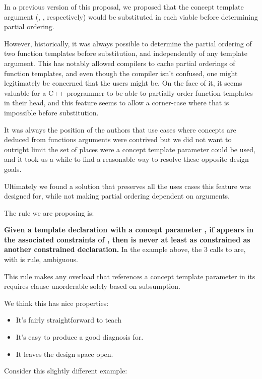 \documentclass{wg21}
\begin{document}
In a previous version of this proposal, we proposed that the concept template argument (, ,  respectively)
would be substituted in each viable  before determining partial ordering.

However, historically, it was always possible to determine the partial ordering of two function templates before substitution, and independently
of any template argument. This has notably allowed compilers to cache partial orderings of function templates, and even though the compiler isn't confused, one might legitimately be concerned that the users might be.
On the face of it, it seems valuable for a C++ programmer to be able to partially order function templates in their head,
and this feature seems to allow a corner-case where that is impossible before substitution.

It was always the position of the authors that use cases where concepts are deduced from functions arguments were contrived but
we did not want to outright limit the set of places were a concept template parameter could be used,
and it took us a while to find a reasonable way to resolve these opposite design goals.

Ultimately we found a solution that preserves all the uses cases this feature was designed for,
while not making partial ordering dependent on arguments.

The rule we are proposing is:

\textbf{Given a template declaration  with a concept parameter , if  appears in the associated constraints of , then  is never at least as constrained as another constrained declaration.}
In the example above, the 3 calls to  are, with is rule, ambiguous.

This rule makes any overload that references a concept template parameter in its requires clause unorderable solely based on subsumption.


We think this has nice properties:
\begin{itemize}
    \item It's fairly straightforward to teach
    \item It's easy to produce a good diagnosis for.
    \item It leaves the design space open.
\end{itemize}

Consider this slightly different example:

\end{document}
